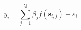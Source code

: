 \documentclass[10pt]{article}
\begin{document}
\[y_i = \sum_{j=1}^Q \beta_j f(\bm{s}_{i,j}) + \varepsilon_i\]
\end{document}
